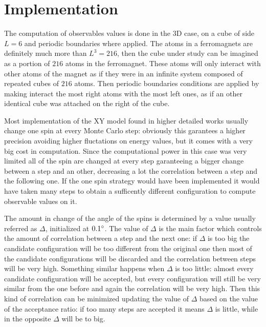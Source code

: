 \section{Implementation}

The computation of observables values is done in the 3D case, on a cube
of side $L=6$ and periodic boundaries where applied. The atoms in a ferromagnets are
definitely much more than $L^3 = 216$, then the cube under study can be imagined as 
a portion of $216$ atoms in the ferromagnet. These atoms will only interact with other
atoms of the magnet as if they were in an infinite system composed of repeated cubes 
of $216$ atoms. Then periodic boundaries conditions are applied by making interact
the most right atoms with the most left ones, as if an other identical cube was
attached on the right of the cube.

Most implementation of the XY model found in higher detailed works usually change one spin
at every Monte Carlo step: obviously this garantees a higher precision avoiding 
higher fluctations on energy values, but it comes with a very big cost in computation. 
Since the computational power in this case was very limited all of the spin are 
changed at every step garanteeing a bigger change between a step and an other, 
decreasing a lot the correlation between a step and the following one. If the one spin
strategy would have been implemented it would have taken many steps to obtain a 
sufficently different configuration to compute observable values on it.

The amount in change of the angle of the spins is determined by a value usually referred as 
$\Delta$, initialized at $0.1 \degree$. The value of $\Delta$ is the main factor which
controls the amount of correlation between a step and the next one: if $\Delta$ is too
big the candidate configuration will be too different from the original one then most
of the candidate configurations will be discarded and the correlation between steps will
be very high. Something similar happens when $\Delta$ is too little: almost every
candidate configuration will be accepted, but every configuration will still be very
similar from the one before and again the correlation will be very high. Then this
kind of correlation can be minimized updating the value of $\Delta$ based on the value
of the acceptance ratio: if too many steps are accepted it means $\Delta$ is little,
while in the opposite $\Delta$ will be to big.

